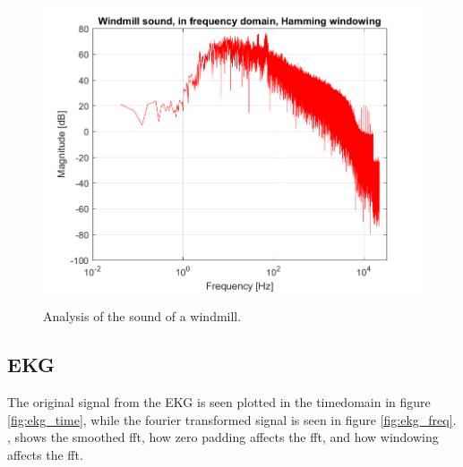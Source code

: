 \begin{figure}[htb!]
	{\includegraphics[width=0.45\linewidth]{code/Windmill_figure5.png}}
	\caption{Analysis of the sound of a windmill.}\label{fig:windmill}
\end{figure}


\subsection{EKG}
The original signal from the EKG is seen plotted in the timedomain in figure \ref{fig:ekg_time}, while the fourier transformed signal is seen in figure \ref{fig:ekg_freq}.
, shows the smoothed fft, how zero padding affects the fft, and how windowing affects the fft.



